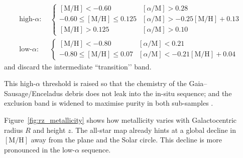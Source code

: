 \documentclass[a4paper,12pt]{article}
\begin{document}
\[
\begin{aligned}
\text{high-}\alpha:\;&
  \begin{cases}
    [\mathrm{M/H}]<-0.60 &
      [\alpha/\mathrm{M}]>0.28\\
    -0.60\le[\mathrm{M/H}]\le0.125 &
      [\alpha/\mathrm{M}]>-0.25[\mathrm{M/H}]+0.13\\
    [\mathrm{M/H}]>0.125 &
      [\alpha/\mathrm{M}]>0.10
  \end{cases}\\[4pt]
\text{low-}\alpha:\;&
  \begin{cases}
    [\mathrm{M/H}]<-0.80 &
      [\alpha/\mathrm{M}]<0.21\\
    -0.80\le[\mathrm{M/H}]\le0.07 &
      [\alpha/\mathrm{M}]<-0.21[\mathrm{M/H}]+0.04
  \end{cases}
\end{aligned}
\]
%
and discard the intermediate “transition’’ band.

This high-$\alpha$ threshold is raised so that the
chemistry of the Gaia–Sausage/Enceladus debris
\citep{Belokurov2018,Helmi2018} does not leak into the
in-situ sequence;  
and the exclusion band is widened to maximise purity in both
sub-samples \citep{Vis2024}.  

Figure~\ref{fig:rz_metallicity} shows how metallicity varies with Galactocentric radius \(R\) and height \(z\).
The all-star map already hints at a global decline in \( [\mathrm{M/H}] \) away from the plane and the Solar circle.
This decline is more pronounced in the low-$\alpha$ sequence.
\end{document}
